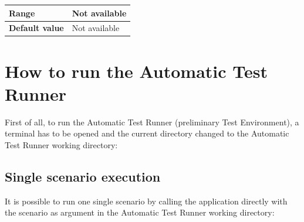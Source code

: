 \documentclass{template/openetcs}
\begin{document}
\begin{itemize}
\begin{longtable}{|l|l|}
				\hline
																																									
					\begin{minipage}[t]{0.22\linewidth} \textbf{Range}	\end{minipage} 
				&	\begin{minipage}[t]{0.78\linewidth} Not available \end{minipage} \\
				
				\hline
				
					\begin{minipage}[t]{0.22\linewidth} \textbf{Default value}	\end{minipage} 
				&	\begin{minipage}[t]{0.78\linewidth} Not available \end{minipage} \\
				
				\hline				
			\end{longtable}				
	\end{itemize}
\section{How to run the Automatic Test Runner}
First of all, to run the Automatic Test Runner (preliminary Test Environment), a terminal has to be opened and the current directory changed to the Automatic Test Runner working directory:
\newline
{}
\subsection{Single scenario execution}
It is possible to run one single scenario by calling the application directly with the scenario as argument in the Automatic Test Runner working directory:
\newline 
{}
\end{document}
